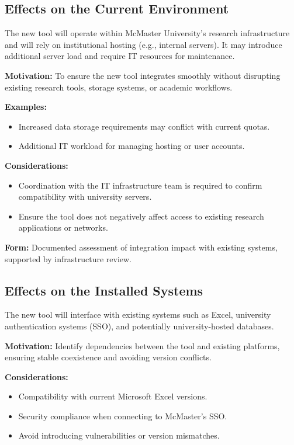 \documentclass[12pt]{article}
\begin{document}
\subsection{Effects on the Current Environment}

The new tool will operate within McMaster University’s research infrastructure and will rely on institutional hosting (e.g., internal servers). It may introduce additional server load and require IT resources for maintenance.

\textbf{Motivation:} To ensure the new tool integrates smoothly without disrupting existing research tools, storage systems, or academic workflows.

\textbf{Examples:}
\begin{itemize}
    \item Increased data storage requirements may conflict with current quotas.
    \item Additional IT workload for managing hosting or user accounts.
\end{itemize}

\textbf{Considerations:}
\begin{itemize}
    \item Coordination with the IT infrastructure team is required to confirm compatibility with university servers.
    \item Ensure the tool does not negatively affect access to existing research applications or networks.
\end{itemize}

\textbf{Form:} Documented assessment of integration impact with existing systems, supported by infrastructure review.

\subsection{Effects on the Installed Systems}

The new tool will interface with existing systems such as Excel, university authentication systems (SSO), and potentially university-hosted databases.

\textbf{Motivation:} Identify dependencies between the tool and existing platforms, ensuring stable coexistence and avoiding version conflicts.

\textbf{Considerations:}
\begin{itemize}
    \item Compatibility with current Microsoft Excel versions.
    \item Security compliance when connecting to McMaster’s SSO.
    \item Avoid introducing vulnerabilities or version mismatches.
\end{itemize}
\end{document}

